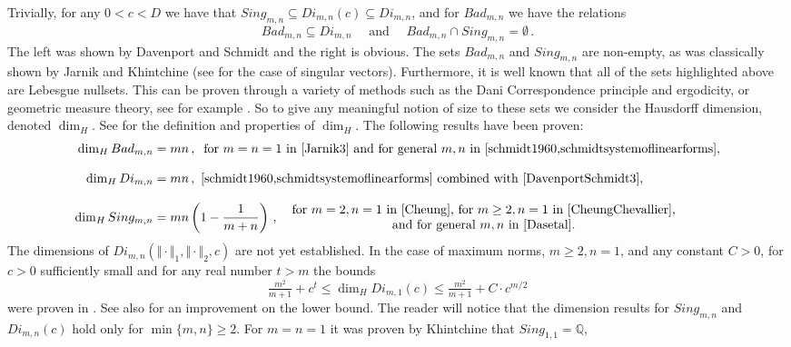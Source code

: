 \documentclass[10pt]{amsart}
\theoremstyle{definition}
\newcommand{\Q}{\mathbb{Q}}
\begin{document}
 Trivially, for any $0<c<D$ we have that $Sing_{m,n} \subseteq Di_{m,n}(c)\subseteq Di_{m,n}$, and for $Bad_{m,n}$ we have the relations
 \begin{equation*}
     Bad_{m,n}\subseteq Di_{m,n} \quad \text{ and } \quad Bad_{m,n}\cap Sing_{m,n}=\emptyset\, .
 \end{equation*}
 The left was shown by Davenport and Schmidt \cite[Theorem 2]{DavenportSchmidt3} and the right is obvious. The sets $Bad_{m,n}$ and $Sing_{m,n}$ are non-empty, as was classically shown by Jarnik and Khintchine (see \cite{Khinchin3} for the case of singular vectors). Furthermore, it is well known that all of the sets highlighted above are Lebesgue nullsets. This can be proven through a variety of methods such as the Dani Correspondence principle and ergodicity, or geometric measure theory, see for example \cite{BDGW_null}. So to give any meaningful notion of size to these sets we consider the Hausdorff dimension, denoted $\dim_H$. See \cite{Falconer_book2013} for the definition and properties of $\dim_H$. The following results have been proven:
\begin{align*}
\dim_H Bad_{m,n} &= mn\, ,\;\;   \text{for  $m=n=1$ in \cite{Jarnik3} and for general $m,n$ in \cite{schmidt1960,schmidtsystemoflinearforms}},\\[2ex]
\dim_H Di_{m,n} &= mn\, ,  
    \text{ \cite{schmidt1960,schmidtsystemoflinearforms} combined with \cite[Theorem 2]{DavenportSchmidt3}}, \\[2ex]
    \dim_H Sing_{m,n} &= mn\left(1-\frac{1}{m+n}\right)\, ,\;\;
    \begin{array}{c}\text{for  $m=2, n=1$ in \cite{Cheung}, for $m\geq 2, n=1$ in \cite{CheungChevallier},}\\
    \text{and for general $m,n$ in~\cite[Theorem~1.1]{Dasetal}}.
    \end{array}
\end{align*}
The dimensions of $Di_{m,n}(\Vert\cdot\Vert_{1},\Vert\cdot\Vert_{2},c)$ are not yet established. In the case of maximum norms, $m\geq 2, n=1$, and any constant $C>0$, for $c>0$ sufficiently small and for any real number $t>m$ the bounds
\begin{equation*}
    \tfrac{m^{2}}{m+1}+c^{t}\leq \dim_H Di_{m,1}(c)\leq \tfrac{m^{2}}{m+1}+C\cdot c^{m/2}
\end{equation*}
were proven in \cite[Theorem 1.3]{CheungChevallier}. See also \cite[Corollary 6.12]{CheungChevallier} for an improvement on the lower bound.
The reader will notice that the dimension results for $Sing_{m,n}$ and $Di_{m,n}(c)$ hold only for $\min\{m,n\}\geq 2$. For $m=n=1$ it was proven by Khintchine \cite{Khinchin3} that $Sing_{1,1}=\Q$,
\end{document}
